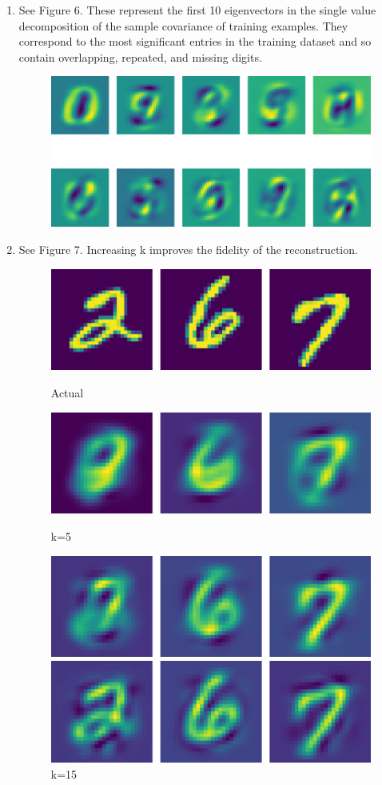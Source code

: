 \begin{enumerate}
\begin{figure}[h!]
	    \caption{}
	\end{figure}
    \item See Figure 6. These represent the first 10 eigenvectors in the single value decomposition of the sample covariance of training examples. They correspond to the most significant entries in the training dataset and so contain overlapping, repeated, and missing digits.
	\begin{figure}[h!]
	    \centering
	    \includegraphics[width=0.8\linewidth]{../figures/a4_eigenvectors.pdf}
	    \caption{}
	\end{figure}
    \item See Figure 7. Increasing k improves the fidelity of the reconstruction. 
    \begin{figure}[h!]
	    \centering
	    \caption{}
	    \includegraphics[width=0.6\linewidth]{../figures/a4_actual.pdf}
	    \caption*{Actual}
	    \includegraphics[width=0.6\linewidth]{../figures/a4_recon_5.pdf}
	    \caption*{k=5}
	    \includegraphics[width=0.6\linewidth]{../figures/a4_recon_15.pdf}
	    \caption*{k=15}
	    \includegraphics[width=0.6\linewidth]{../figures/a4_recon_40.pdf}

\end{figure}
\end{enumerate}
